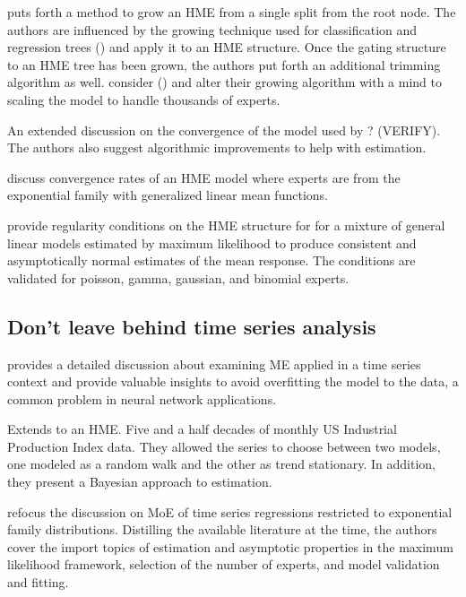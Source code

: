 \documentclass[12pt]{article}
\begin{document}
\bigskip

\cite{WaterhouseRobinson1995} puts forth a method to grow an HME from a 
single split from the root node. The authors are influenced by the growing
technique used for classification and regression trees (\cite{CART1984}) and
apply it to an HME structure. Once the gating structure to an HME tree has
been grown, the authors put forth an additional trimming algorithm as well.
\cite{FFW1997} consider (\cite{WaterhouseRobinson1995}) and alter their
growing algorithm with a mind to scaling the model to handle thousands of
experts.

\cite{JordanXuConverge1995} An extended discussion on the convergence of the
model used by \cite{JordanJacobs1993} ? (VERIFY). The authors also suggest
algorithmic improvements to help with estimation.

\cite{JiangTanner1999} discuss convergence rates of an HME model where experts
are from the exponential family with generalized linear mean functions.

\cite{JiangTanner2000} provide regularity conditions on the HME structure for
for a mixture of general linear models estimated by maximum likelihood to
produce consistent and asymptotically normal estimates of the mean response.
The conditions are validated for poisson, gamma, gaussian, and binomial experts.


\subsection{Don't leave behind time series analysis}

\cite{WMS1995} provides a detailed discussion about examining ME applied in
a time series context and provide valuable insights to avoid overfitting the
model to the data, a common problem in neural network applications.

\cite{HuertaJiangTanner2003} Extends \cite{WMS1995} to an HME.
Five and a half decades of monthly US Industrial Production
Index data. They allowed the series to choose between two models, one modeled
as a random walk and the other as trend stationary. In addition, they present a
Bayesian approach to estimation.

\cite{CarvalhoTanner2006} refocus the discussion on MoE of time series
regressions restricted to exponential family distributions. Distilling
the available literature at the time, the authors cover the import topics of
estimation and asymptotic properties in the maximum likelihood
framework, selection of the number of experts, and model validation and
fitting.
\end{document}
